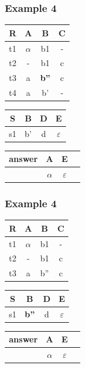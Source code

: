 \documentclass{beamer}
\begin{document}
\begin{frame}
  \frametitle{Example 4}

  \begin{tabular}{ c | c c c}
  R & A & B & C \\
  \hline
  t1 & $\alpha$  & b1  & - \\
  t2 & -  & b1  & c \\
  t3 & a & \textbf{b''} & c \\
  t4 & a  & b' & - \\
  \end{tabular}
   \begin{tabular}{ c | c c c}
  S & B & D & E \\
  \hline
  s1 & b'  & d  & $\varepsilon$ \\
  \end{tabular}
  \begin{tabular}{ c | c c c}
  answer & A & E \\
  \hline
   & $\alpha$& $\varepsilon$\\
  \end{tabular}
\end{frame}


\begin{frame}
  \frametitle{Example 4}

  \begin{tabular}{ c | c c c}
  R & A & B & C \\
  \hline
  t1 & $\alpha$  & b1  & - \\
  t2 & -  & b1  & c \\
  t3 & a & b'' & c \\
  \end{tabular}
   \begin{tabular}{ c | c c c}
  S & B & D & E \\
  \hline
  s1 & \textbf{b''}  & d  & $\varepsilon$ \\
  \end{tabular}
  \begin{tabular}{ c | c c c}
  answer & A & E \\
  \hline
   & $\alpha$& $\varepsilon$\\
  \end{tabular}
\end{frame}
\end{document}
